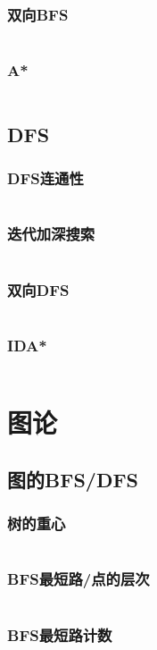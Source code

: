 \documentclass[a4paper,12pt]{article}
\begin{document}
\subsubsection{双向BFS}
\inputminted[breaklines]{c++}{search/bfs/2side_bfs.cc}
\subsubsection{A*}
\inputminted[breaklines]{c++}{search/bfs/astar.cc}
\subsection{DFS}
\subsubsection{DFS连通性}
\inputminted[breaklines]{c++}{search/dfs/link.cc}
\subsubsection{迭代加深搜索}
\inputminted[breaklines]{c++}{search/dfs/diedai.cc}
\subsubsection{双向DFS}
\inputminted[breaklines]{c++}{search/dfs/2side.cc}
\subsubsection{IDA*}
\inputminted[breaklines]{c++}{search/dfs/ida.cc}


\newpage
\section{图论} %
\subsection{图的BFS/DFS}  %
\subsubsection{树的重心}
\inputminted[breaklines]{c++}{graph/bdfs/grav.cc}
\subsubsection{BFS最短路/点的层次}
\inputminted[breaklines]{c++}{graph/bdfs/cenci.cc}
\subsubsection{BFS最短路计数}
\inputminted[breaklines]{c++}{graph/bdfs/sum.cc}
\end{document}
